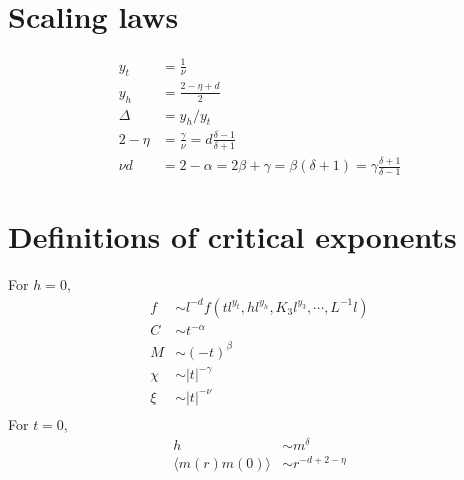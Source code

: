 \section{Scaling laws}
\begin{align}
  y_t &= \frac{1}{\nu}\\
  y_h &= \frac{2-\eta +d}{2}\\
  \Delta &= y_h/y_t\\
	2 - \eta &= \frac{\gamma}{\nu} = d\frac{\delta -1}{\delta+1}\\
	\nu d &= 2-\alpha = 2\beta + \gamma = \beta(\delta+1) = \gamma\frac{\delta +1}{\delta -1}
\end{align}
\section{Definitions of critical exponents}
For $h=0$,
\begin{align}
  f &\sim l^{-d}f(tl^{y_t},hl^{y_h},K_3l^{y_3},\cdots,L^{-1}l)\\
  C &\sim t^{-\alpha}\\
  M &\sim (-t)^{\beta}\\
  \chi &\sim |t|^{-\gamma}\\
  \xi &\sim |t|^{-\nu}\\
\end{align}  
For $t =0$,
\begin{align}
  h &\sim m^{\delta}\\
  \langle m(r)m(0)\rangle &\sim r^{-d +2 -\eta}
  \label{}
\end{align}
